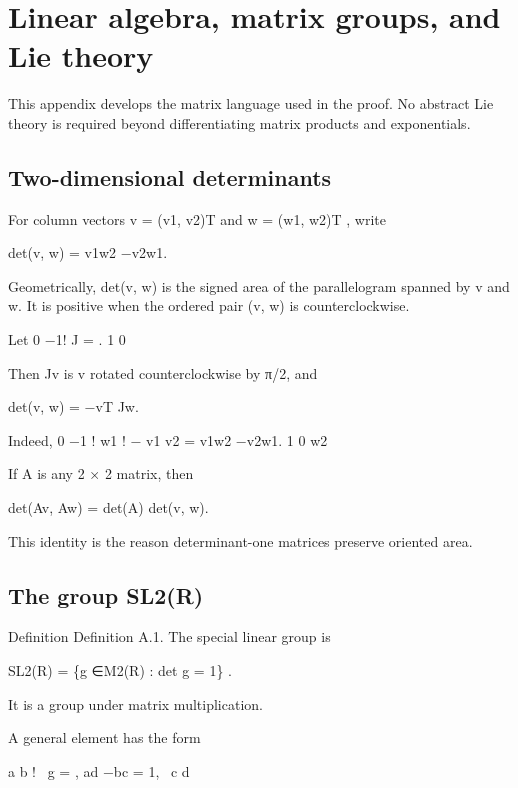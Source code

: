 \chapter{Linear algebra, matrix groups, and Lie theory}
This appendix develops the matrix language used in the proof. No abstract Lie theory is required beyond differentiating matrix products and exponentials.


\section{Two-dimensional determinants}

\begin{displaytext}
For column vectors v = (v1, v2)T and w = (w1, w2)T , write
\end{displaytext}

det(v, w) = v1w2 −v2w1.


Geometrically, det(v, w) is the signed area of the parallelogram spanned by v and w. It is positive when the ordered pair (v, w) is counterclockwise.


Let 0 −1! J = . 1 0


Then Jv is v rotated counterclockwise by π/2, and


det(v, w) = −vT Jw.


Indeed, 0 −1 ! w1 ! − v1 v2 = v1w2 −v2w1. 1 0 w2


If A is any 2 × 2 matrix, then


det(Av, Aw) = det(A) det(v, w).


This identity is the reason determinant-one matrices preserve oriented area.


\section{The group SL2(R)}

\begin{statementbox}{Definition}
Definition A.1. The special linear group is
\end{statementbox}

\begin{displaytext}
SL2(R) = \{g ∈M2(R) : det g = 1\} .
\end{displaytext}

It is a group under matrix multiplication.


A general element has the form


\begin{displaytext}
a b ! \
g = , ad −bc = 1, \
c d
\end{displaytext}

